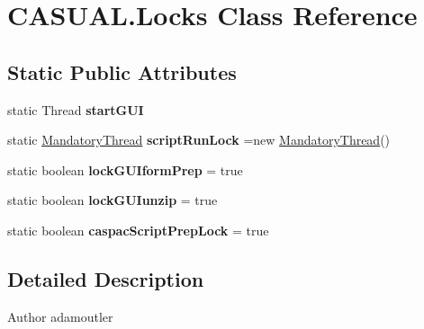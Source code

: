 \hypertarget{classCASUAL_1_1Locks}{\section{C\-A\-S\-U\-A\-L.\-Locks Class Reference}
\label{classCASUAL_1_1Locks}
}
\subsection*{Static Public Attributes}
\begin{DoxyCompactItemize}
\item 
static Thread {\bfseries start\-G\-U\-I}
\item 
\hypertarget{classCASUAL_1_1Locks_a4c5cfed071b9314a781143939b6ca59f}{static \hyperlink{classCASUAL_1_1misc_1_1MandatoryThread}{Mandatory\-Thread} {\bfseries script\-Run\-Lock} =new \hyperlink{classCASUAL_1_1misc_1_1MandatoryThread}{Mandatory\-Thread}()}\label{classCASUAL_1_1Locks_a4c5cfed071b9314a781143939b6ca59f}

\item 
\hypertarget{classCASUAL_1_1Locks_a58d1360da878b0d7707313703e7edbf9}{static boolean {\bfseries lock\-G\-U\-Iform\-Prep} = true}\label{classCASUAL_1_1Locks_a58d1360da878b0d7707313703e7edbf9}

\item 
\hypertarget{classCASUAL_1_1Locks_a51d3cb2cd6ddb238ada918a75ef3dcc8}{static boolean {\bfseries lock\-G\-U\-Iunzip} = true}\label{classCASUAL_1_1Locks_a51d3cb2cd6ddb238ada918a75ef3dcc8}

\item 
\hypertarget{classCASUAL_1_1Locks_ac79b2141772d3690d9fe2ad8b8a8a649}{static boolean {\bfseries caspac\-Script\-Prep\-Lock} = true}\label{classCASUAL_1_1Locks_ac79b2141772d3690d9fe2ad8b8a8a649}

\end{DoxyCompactItemize}


\subsection{Detailed Description}
\begin{DoxyAuthor}{Author}
adamoutler 
\end{DoxyAuthor}


